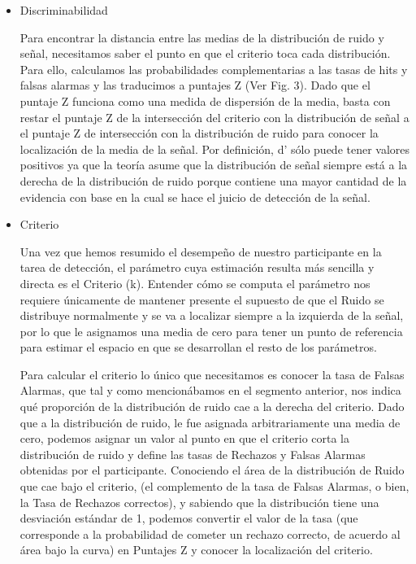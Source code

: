 \begin{itemize}
\item Discriminabilidad

Para encontrar la distancia entre las medias de la distribución de ruido y señal, necesitamos saber el punto en que el criterio toca cada distribución. Para ello, calculamos las probabilidades complementarias a las tasas de hits y falsas alarmas y las traducimos a puntajes Z (Ver Fig. 3). Dado que el puntaje Z funciona como una medida de dispersión de la media, basta con restar el puntaje Z de la intersección del criterio con la distribución de señal a el puntaje Z de intersección con la distribución de ruido para conocer la localización de la media de la señal. Por definición, d’ sólo puede tener valores positivos ya que la teoría asume que la distribución de señal siempre está a la derecha de la distribución de ruido porque contiene una mayor cantidad de la evidencia con base en la cual se hace el juicio de detección de la señal.



\item Criterio

Una vez que hemos resumido el desempeño de nuestro participante en la tarea de detección, el parámetro cuya estimación resulta más sencilla y directa es el Criterio (k). Entender cómo se computa el parámetro nos requiere únicamente de mantener presente el supuesto de que el Ruido se distribuye normalmente y se va a localizar siempre a la izquierda de la señal, por lo que le asignamos una media de cero para tener un punto de referencia para estimar el espacio en que se desarrollan el resto de los parámetros. 

Para calcular el criterio lo único que necesitamos es conocer la tasa de Falsas Alarmas, que tal y como mencionábamos en el segmento anterior, nos indica qué proporción de la distribución de ruido cae a la derecha del criterio. Dado que a la distribución de ruido, le fue asignada arbitrariamente una media de cero, podemos asignar un valor al punto en que el criterio corta la distribución de ruido y define las tasas de Rechazos y Falsas Alarmas obtenidas por el participante. Conociendo el área de la distribución de Ruido que cae bajo el criterio, (el complemento de la tasa de Falsas Alarmas, o bien, la Tasa de Rechazos correctos), y sabiendo que la distribución tiene una desviación estándar de 1, podemos convertir el valor de la tasa (que corresponde a la probabilidad de cometer un rechazo correcto, de acuerdo al área bajo la curva) en Puntajes Z y conocer la localización del criterio.


\end{itemize}
